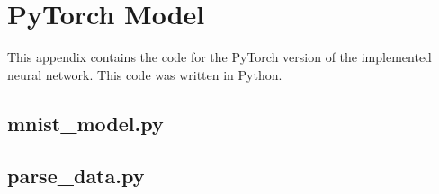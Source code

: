 \chapter{PyTorch Model}
This appendix contains the code for the PyTorch version of the implemented neural network. This code was written in Python.

\section{mnist\_model.py}

\pagebreak

\section{parse\_data.py}

\pagebreak